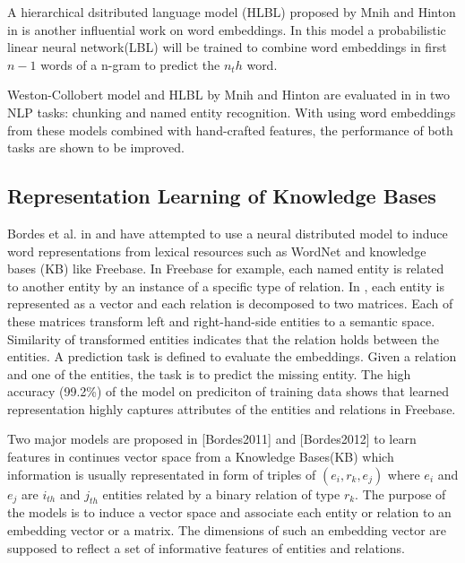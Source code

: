 A hierarchical dsitributed language model (HLBL) proposed by Mnih and
Hinton in \cite{Mnih2009} is another influential work on word embeddings. In
this model a probabilistic linear neural network(LBL) will be trained to 
combine word embeddings in first $n-1$ words of a n-gram to predict the $n_th$ word.

Weston-Collobert model and HLBL by Mnih and Hinton are evaluated in
\cite{Turian2010b} in two NLP tasks: chunking and named entity recognition. With
using word embeddings from these models combined with hand-crafted features, the
performance of both tasks are shown to be improved.
 
\subsection{Representation Learning of Knowledge Bases}
\label{sec: repr-learning-kb}
Bordes et al. in \cite{Bordes2011} and \cite{Bordes2012} have attempted to use
a neural distributed model to induce word representations from lexical resources
such as WordNet and knowledge bases (KB) like Freebase. In Freebase for example, each named entity is related
to another entity by an instance of a specific type of relation. In
\cite{Bordes2011}, each entity is represented as a vector and each relation is decomposed to two
matrices. Each of these matrices transform left and right-hand-side entities
to a semantic space. Similarity of transformed entities indicates that the
relation holds between the entities.  A prediction task is defined to evaluate
the embeddings. Given a relation and one of the entities, the task is to predict
the missing entity. The high accuracy (99.2\%) of the model on prediciton
of training data shows that learned representation highly captures attributes of
the entities and relations in Freebase.

Two major models are proposed in [Bordes2011] and [Bordes2012] to learn features in continues vector space
 from a Knowledge Bases(KB) which information is usually representated in form of triples of $(e_{i},r_{k} , e_{j} )$ 
 where $e_{i}$ and $e_{j}$ are $i_{th}$ and $j_{th}$ entities related
 by a binary relation of type $r_{k}$. The purpose of the models is to induce a vector space and associate
  each entity or relation to an embedding vector or a matrix.
  The dimensions of such an embedding vector are supposed to reflect a set of informative features of entities and relations.
   

